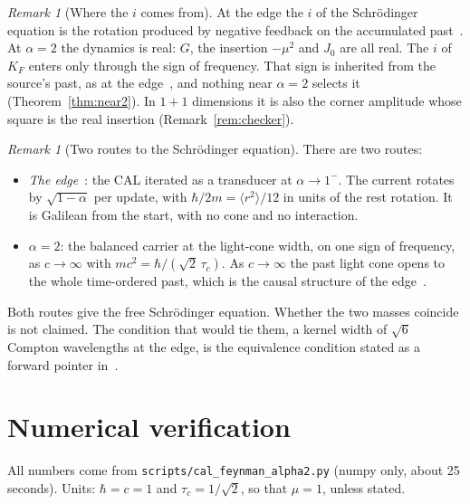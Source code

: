\documentclass[11pt]{amsart}
\theoremstyle{definition}
\theoremstyle{remark}
\newtheorem{remark}[theorem]{Remark}
\begin{document}
\begin{remark}[Where the $i$ comes from]\label{rem:i}
At the edge the $i$ of the Schr\"odinger equation is the rotation produced by negative feedback on the accumulated past~\cite[Thm.~5.1]{Edge}. At $\alpha=2$ the dynamics is real: $G$, the insertion $-\mu^2$ and $J_0$ are all real. The $i$ of $K_F$ enters only through the sign of frequency. That sign is inherited from the source's past, as at the edge~\cite[Prop.~5.4]{Edge}, and nothing near $\alpha=2$ selects it (Theorem~\ref{thm:near2}). In $1+1$ dimensions it is also the corner amplitude whose square is the real insertion (Remark~\ref{rem:checker}).
\end{remark}

\begin{remark}[Two routes to the Schr\"odinger equation]\label{rem:routes}
There are two routes:
\begin{itemize}
\item \emph{The edge}~\cite{Edge}: the CAL iterated as a transducer at $\alpha\to1^-$. The current rotates by $\sqrt{1-\alpha}$ per update, with $\hbar/2m=\langle r^2\rangle/12$ in units of the rest rotation. It is Galilean from the start, with no cone and no interaction.
\item \emph{$\alpha=2$}: the balanced carrier at the light-cone width, on one sign of frequency, as $c\to\infty$ with $mc^2=\hbar/(\sqrt2\,\tau_c)$. As $c\to\infty$ the past light cone opens to the whole time-ordered past, which is the causal structure of the edge~\cite[\S7.1]{Edge}.
\end{itemize}
Both routes give the free Schr\"odinger equation. Whether the two masses coincide is not claimed. The condition that would tie them, a kernel width of $\sqrt6$ Compton wavelengths at the edge, is the equivalence condition stated as a forward pointer in~\cite[\S9]{Edge}.
\end{remark}

\section{Numerical verification}\label{sec:num}

All numbers come from \texttt{scripts/cal\_feynman\_alpha2.py} (numpy only, about 25 seconds). Units: $\hbar=c=1$ and $\tau_c=1/\sqrt2$, so that $\mu=1$, unless stated.
\end{document}
